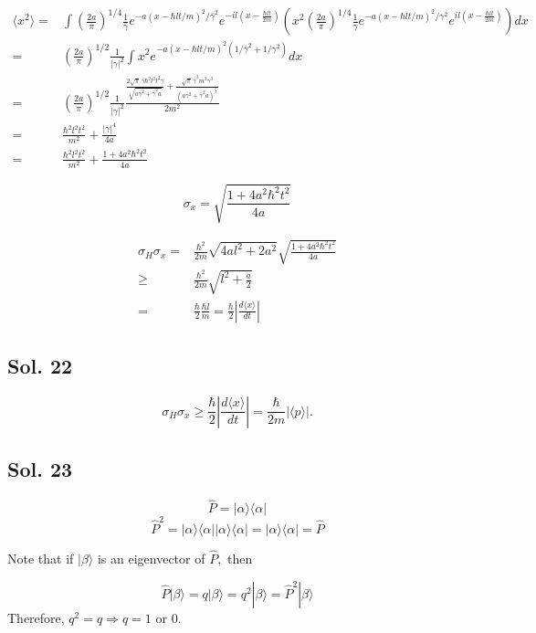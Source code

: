 \begin{align*}
    \langle x^2\rangle
    =&
    \int 
    \left(\frac{2a}{\pi}\right)^{1/4}
\frac{1}{\bar{\gamma}}
e^{-a(x-\hbar lt/m)^2/\bar{\gamma}^2}
e^{-il(x-\frac{\hbar lt}{2m})}
\left(
x^2
\left(\frac{2a}{\pi}\right)^{1/4}
\frac{1}{\gamma}
e^{-a(x-\hbar lt/m)^2/\gamma^2}
e^{il(x-\frac{\hbar lt}{2m})}
\right)dx\\
=&
\left(\frac{2a}{\pi}\right)^{1/2}
\frac{1}{|\gamma|^2}
\int x^2
e^{-a(x-\hbar lt/m)^2(1/\bar{\gamma}^2+1/\gamma^2)}dx\\
=&
\left(\frac{2a}{\pi}\right)^{1/2}
\frac{1}{|\gamma|^2}
\frac{\frac{2 \sqrt{\pi} \, \bar{\gamma}\hbar^{2} l^{2} t^{2} {\gamma}}{\sqrt{a{\gamma}^{2} + \bar{\gamma}^{2} a}} + \frac{\sqrt{\pi} \, \bar{\gamma}^{3} m^{2} {\gamma}^{3}}{\left(a{\gamma}^{2} + \bar{\gamma}^{2} a\right)^{\frac{3}{2}}}}{2m^{2}}\\
=&
\frac{\hbar^2l^2t^2}{m^2}
+\frac{|\gamma|^4}{4a}
\\
=&
\frac{\hbar^2l^2t^2}{m^2}
+\frac{1+4a^2\hbar^2t^2}{4a}
\end{align*}

$$\sigma_x=\sqrt{\frac{1+4a^2\hbar^2t^2}{4a}}$$

\begin{align*}
    \sigma_H\sigma_x=&
    \frac{\hbar^2}{2m}\sqrt{4al^2+2a^2}
    \sqrt{\frac{1+4a^2\hbar^2t^2}{4a}}\\
    \geq &
    \frac{\hbar^2}{2m}\sqrt{l^2+\frac{a}{2}}\\
    =&
    \frac{\hbar}{2}
    \frac{\hbar l}{m}=\frac{\hbar}{2}\left|\frac{d\langle x\rangle}{dt}\right|
\end{align*}

\subsection*{Sol. 22}
$$
\sigma_H\sigma_x\geq \frac{\hbar}{2}\left|\frac{d\langle x\rangle}{dt}\right|
=\frac{\hbar}{2m}|\langle p\rangle|.
$$

\subsection*{Sol. 23}
$$
\hat{P}=|\alpha\rangle\langle\alpha|
$$
$$
\hat{P}^2=|\alpha\rangle\langle\alpha||\alpha\rangle\langle\alpha|=|\alpha\rangle\langle\alpha|=\hat{P}
$$

Note that if $|\beta\rangle$ is an eigenvector of $\hat{P},$ then

$$
\hat{P}|\beta\rangle = q|\beta\rangle
=q^2|\beta\rangle=\hat{P}^2|\beta\rangle
$$
Therefore, $q^2=q\Rightarrow q=1$ or $0.$

